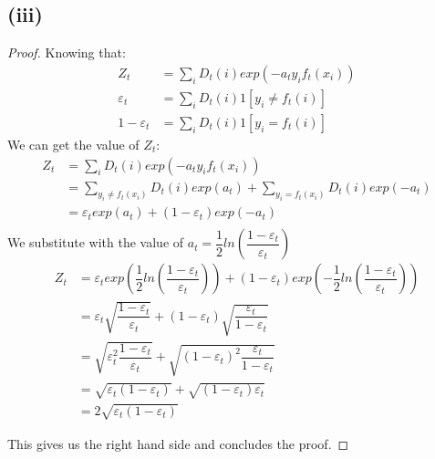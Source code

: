 \documentclass[]{homework}
\begin{document}
\subsection*{(iii)}
\begin{proof}
Knowing that:
\begin{align}
    Z_t &= \sum_i D_t(i) exp(-a_ty_if_t(x_i)) \\
    \varepsilon_t &= \sum_i D_t(i) 1[y_i \neq f_t(i)] \\
    1-\varepsilon_t &= \sum_i D_t(i) 1[y_i = f_t(i)]
\end{align}
We can get the value of $Z_t$:
\begin{align*}
    Z_t &= \sum_i D_t(i) exp(-a_ty_if_t(x_i)) \\
    &= \sum_{y_i\neq f_t(x_i)} D_t(i) exp(a_t) + \sum_{y_i=f_t(x_i)} D_t(i) exp(-a_t) \\
    &= \varepsilon_t exp(a_t) + (1-\varepsilon_t) exp(-a_t) \\
\end{align*}
We substitute with the value of $a_t=\dfrac{1}{2}ln(\dfrac{1-\varepsilon_t}{\varepsilon_t})$
\begin{align*}
    Z_t &= \varepsilon_t exp(\dfrac{1}{2}ln(\dfrac{1-\varepsilon_t}{\varepsilon_t})) + (1-\varepsilon_t) exp(-\dfrac{1}{2}ln(\dfrac{1-\varepsilon_t}{\varepsilon_t})) \\
    &= \varepsilon_t \sqrt{\dfrac{1-\varepsilon_t}{\varepsilon_t}} + (1-\varepsilon_t) \sqrt{\dfrac{\varepsilon_t}{1-\varepsilon_t}}\\
    &= \sqrt{\varepsilon_t^2 \dfrac{1-\varepsilon_t}{\varepsilon_t}} + \sqrt{(1-\varepsilon_t)^2 \dfrac{\varepsilon_t}{1-\varepsilon_t}}\\
    &= \sqrt{\varepsilon_t (1-\varepsilon_t)} + \sqrt{(1-\varepsilon_t)\varepsilon_t}\\
    &= 2\sqrt{\varepsilon_t (1-\varepsilon_t)} 
\end{align*}

This gives us the right hand side and concludes the proof.
\end{proof}
\end{document}
